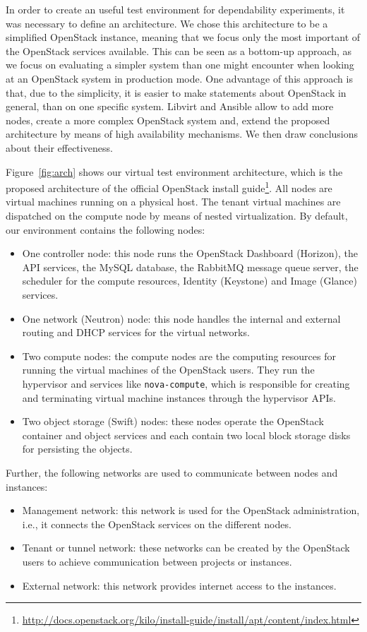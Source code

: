 \documentclass[conference]{IEEEtran}
\begin{document}
In order to create an useful test environment for dependability experiments, it was necessary to define an architecture. We chose this architecture to be a simplified OpenStack instance, meaning that we focus only the most important of the OpenStack services available. This can be seen as a bottom-up approach, as we focus on evaluating a simpler system than one might encounter when looking at an OpenStack system in production mode. One advantage of this approach is that, due to the simplicity, it is easier to make statements about OpenStack in general, than on one specific system. Libvirt and Ansible allow to add more nodes, create a more complex OpenStack system and, extend the proposed architecture by means of high availability mechanisms. We then draw conclusions about their effectiveness.

Figure~\ref{fig:arch} shows our virtual test environment architecture, which is the proposed architecture of the official OpenStack install guide\footnote{\url{http://docs.openstack.org/kilo/install-guide/install/apt/content/index.html}}. All nodes are virtual machines running on a physical host. The tenant virtual machines are dispatched on the compute node by means of nested virtualization. By default, our environment contains the following nodes:
\begin{itemize}
	\item One controller node: this node runs the OpenStack Dashboard (Horizon), the API services, the MySQL database, the RabbitMQ message queue server, the scheduler for the compute resources, Identity (Keystone) and Image (Glance) services.
	\item One network (Neutron) node: this node handles the internal and external routing and DHCP services for the virtual networks.
	\item Two compute nodes: the compute nodes are the computing resources for running the virtual machines of the OpenStack users. They run the hypervisor and services like \verb|nova-compute|, which is responsible for creating and terminating virtual machine instances through the hypervisor APIs.
	\item Two object storage (Swift) nodes: these nodes operate the OpenStack container and object services and each contain two local block storage disks for persisting the objects.
\end{itemize}

Further, the following networks are used to communicate between nodes and instances:
\begin{itemize}
	\item Management network: this network is used for the OpenStack administration, i.e., it connects the OpenStack services on the different nodes. 
	\item Tenant or tunnel network: these networks can be created by the OpenStack users to achieve communication between projects or instances. 
	\item External network: this network provides internet access to the instances.
\end{itemize}
\end{document}
